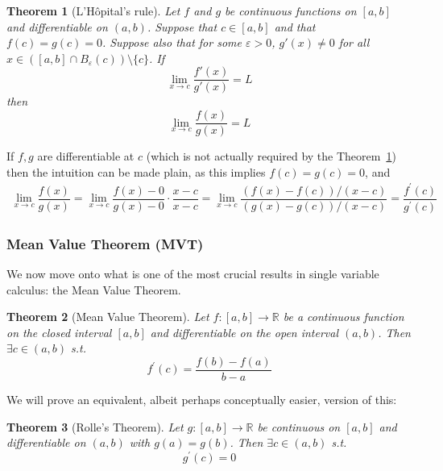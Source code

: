 \documentclass{article}
\theoremstyle{mythm}
\newtheorem{theorem}{Theorem}
\theoremstyle{mydef}
\begin{document}
\begin{theorem}[L'H\^opital's rule]\label{thm:lecture4_lhopital}
Let $f$ and $g$ be continuous functions on $[a,b]$ and differentiable on $(a,b)$. Suppose that $c\in[a,b]$ and that $f(c) = g(c) = 0$. Suppose also that for some $\varepsilon > 0$, $g'(x) \neq 0$ for all $x\in \left([a,b] \cap B_\varepsilon(c)\right) \setminus \{c\}$. If 
\begin{equation*}
    \lim_{x\to c} \frac{f'(x)}{g'(x)} = L
\end{equation*}
then 
\begin{equation*}
    \lim_{x\to c} \frac{f(x)}{g(x)} = L
\end{equation*}
\end{theorem}

If $f, g$ are differentiable at $c$ (which is not actually required by the Theorem~\ref{thm:lecture4_lhopital}) then the intuition can be made plain, as this implies $f(c) = g(c) = 0$, and
\begin{align*}
    \lim_{x \to c} \dfrac{f(x)}{g(x)}
    =
    \lim_{x \to c} \dfrac{f(x) - 0}{g(x) - 0} \cdot \dfrac{x - c}{x - c}
    =
    \lim_{x \to c} \dfrac{(f(x) - f(c)) / (x - c)}{(g(x) - g(c)) / (x - c)}
    =
    \dfrac{f^{\prime}(c)}{g^{\prime}(c)}
\end{align*}

\subsubsection{Mean Value Theorem (MVT)}
\label{ssub:mean_value_theorem_mvt_}

We now move onto what is one of the most crucial results in single variable calculus: the Mean Value Theorem. 

\begin{theorem}[Mean Value Theorem]\label{thm:lecture4_mvt}
  Let $f: [a, b] \to \mathbb{R}$ be a continuous function on the closed interval $[a, b]$ and differentiable on the open interval $(a, b)$. Then $\exists c \in (a, b)$ s.t.
  \[
    f^\prime(c) = \dfrac{f(b) - f(a)}{b - a}
  \]
\end{theorem}

We will prove an equivalent, albeit perhaps conceptually easier, version of this:
\begin{theorem}[Rolle's Theorem]\label{thm:lecture4_rolles_theorem}
  Let $g: [a, b] \to \mathbb{R}$ be continuous on $[a, b]$ and differentiable on $(a, b)$ with $g(a) = g(b)$. Then $\exists c \in (a, b)$ s.t.
  \[
    g^\prime(c) = 0
  \]
\end{theorem}
\end{document}
